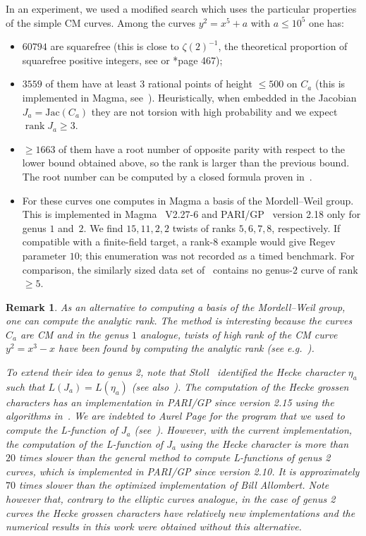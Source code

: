 \documentclass{amsart}
\newcommand{\Jac}{\mathrm{Jac}}
\DeclareMathOperator{\rank}{\mathrm{rank}}
\newtheorem{remark}[proposition]{Remark}
\begin{document}
 
 In an experiment, we used a modified search which uses the particular properties of the simple CM curves. Among the  curves $y^2=x^5+a$ with $a\leq 10^5$ one has:
 \begin{itemize}
 \item $60794$ are squarefree (this is close to $\zeta(2)^{-1}$, the theoretical proportion of squarefree positive integers, see \cite{Graham1981} or \cite{FouvryKlueners2007}*{page 467});
  \item $3559$ of them have at least $3$ rational points of height $\leq 500$ on $C_a$ (this is implemented in Magma, see~\cite{Stoll2016}). Heuristically, when embedded in the Jacobian $J_a=\Jac(C_a)$ they are not torsion with high probability and we expect $\rank J_a\geq 3$. 
  \item $\geq1663$ of them have a root number of opposite parity with respect to the lower bound obtained above, so the rank is larger than the previous bound. The root number can be computed by a closed formula proven in~\cite{Bisatt2022}.
 \item For these curves one computes in Magma a basis of the Mordell--Weil
group. This is implemented in Magma~\cite{magma} V2.27-6 and
PARI/GP~\cite{parigp} version 2.18 only for genus $1$ and~$2$. We find
$15,11,2,2$ twists of ranks $5,6,7,8$, respectively. If compatible with a
finite-field target, a rank-$8$ example would give Regev parameter $10$; this
enumeration was not recorded as a timed benchmark. For comparison, the
similarly sized data set of~\cite{Booker2016} contains no genus-$2$ curve of
rank $\geq 5$.
  \end{itemize}
 
 \begin{remark}
 As an alternative to computing a basis of the Mordell--Weil group, one can compute the analytic rank. The method is interesting because the curves $C_a$ are CM and in the genus $1$ analogue, twists of high rank of the CM curve $y^2=x^3-x$ have been found by computing the analytic rank (see e.g.~\cite{Elkies2002}).    
 
 To extend their idea to genus 2, note that Stoll~\cite{Stoll2002} identified the Hecke character $\eta_a$ such that $L(J_a)=L(\eta_a)$ (see also~\cite{Stoll2003}). The computation of the Hecke grossen characters has an implementation in PARI/GP since version 2.15 using the algorithms in~\cite{Molin2022}. We are indebted to Aurel Page for the program that we used to compute the L-function of $J_a$ (see~\cite{OnlineComplement}). However, with the current implementation, the computation of the L-function of $J_a$ using the Hecke character is more than $20$ times slower than the general method to compute L-functions of genus 2 curves, which is implemented in PARI/GP since version 2.10. It is approximately $70$ times slower than the optimized implementation of Bill Allombert. Note however that, contrary to the elliptic curves analogue, in the case of genus 2 curves the Hecke grossen characters have relatively new implementations and the numerical results in this work were obtained without this alternative.
\end{remark}
\end{document}
